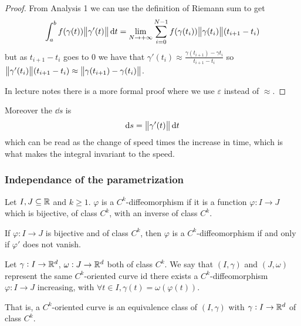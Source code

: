 \documentclass[14pt]{extarticle}
\begin{document}
\begin{proof}
    From Analysis 1 we can use the definition of Riemann sum to get
    \begin{equation}
        \int_a^b f(\gamma(t)) \norm{\gamma'(t)} \dd{t} = \lim_{N \to +\infty} \sum_{i = 0}^{N-1} f(\gamma(t_i)) \norm{\gamma(t_i)} (t_{i+1} - t_i)
    \end{equation}
    but as $t_{i+1} - t_{i}$ goes to $0$ we have that $\gamma'(t_i) \approx \frac{\gamma(t_{i+1}) - \gamma{t_i}}{t_{i+1} - t_i}$ so
    $\norm{\gamma'(t_i)} (t_{i+1} - t_i) \approx \norm{\gamma(t_{i+1}) - \gamma(t_i)}$.

    In lecture notes there is a more formal proof where we use $\varepsilon$ instead of $\approx$.
\end{proof}

Moreover the $\dd{s}$ is
\begin{equation}
    \dd{s} = \norm{\gamma'(t)} \dd{t}
\end{equation}
which can be read as the change of speed times the increase in time, which is what makes the integral invariant to the speed.

\subsubsection{Independance of the parametrization}

\begin{definition}[diffeomorphism]
    Let $I, J \subseteq \mathbb{R}$ and $k \geq 1$.
    $\varphi$ is a $C^k$-diffeomorphism if it is a function $\varphi: I \to J$ which is bijective, of class $C^k$, with an inverse of class $C^k$.
\end{definition}

\begin{proposition}
    If $\varphi: I \to J$ is bijective and of class $C^k$, then $\varphi$ is a $C^k$-diffeomorphism if and only if $\varphi'$ does not vanish.
\end{proposition}

\begin{definition}
    Let $\gamma: I \to \mathbb{R}^d$, $\omega: J \to \mathbb{R}^d$ both of class $C^k$.
    We say that $(I, \gamma)$ and $(J, \omega)$ represent the same $C^k$-oriented curve id there exists a $C^k$-diffeomorphism $\varphi: I \to J$ increasing, with $\forall t \in I, \gamma(t) = \omega(\varphi(t))$.

    That is, a $C^k$-oriented curve is an equivalence class of $(I, \gamma)$ with $\gamma: I \to \mathbb{R}^d$ of class $C^k$.
\end{definition}
\end{document}
